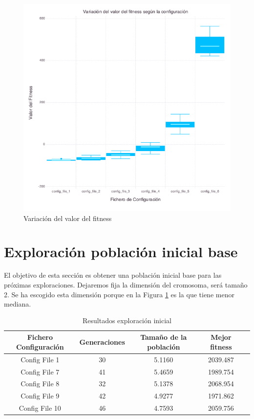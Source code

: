 \begin{figure}[]
	\centering	
	\includegraphics[scale=0.4]{figuras/config_file_1-6_Rastrigin_box_plots.png}
	\caption{ Variación del valor del fitness }
    \label{fig:box_plots}
\end{figure}

\section{Exploración población inicial base}

El objetivo de esta sección es obtener una población inicial base para las próximas exploraciones. Dejaremos fija la dimensión del cromosoma,
será tamaño 2. Se ha escogido esta dimensión porque en la Figura \ref{fig:box_plots} es la que tiene menor mediana.




\begin{table}[]
    \centering
    \begin{tabular}{||c|c|c|c|c||}
        \hline
        \textbf{Fichero Configuración} & \textbf{Generaciones} & \textbf{Tamaño de la población} & \textbf{Mejor fitness} \\ \hline
        Config File 1   & 30    & 5.1160  & 2039.487   \\ \hline
        Config File 7   & 41    & 5.4659  & 1989.754   \\ \hline
        Config File 8   & 32    & 5.1378  & 2068.954   \\ \hline
        Config File 9   & 42    & 4.9277  & 1971.862   \\ \hline
        Config File 10   & 46    & 4.7593  & 2059.756   \\ \hline
    \end{tabular}
    \caption{Resultados exploración inicial}
    \label{tab:base_population}
\end{table}



